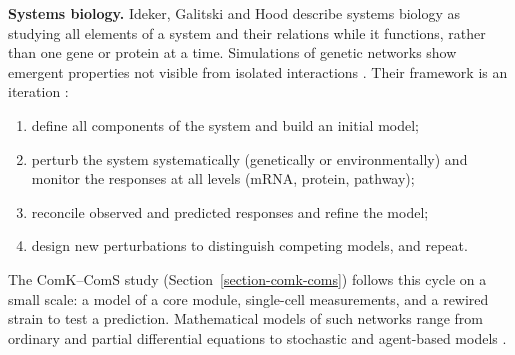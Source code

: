 \textbf{Systems biology.}
Ideker, Galitski and Hood describe systems
biology as studying all elements of a
system and their relations while it
functions, rather than one gene or protein
at a time. Simulations of genetic networks
show emergent properties not visible from
isolated interactions
\cite[p.~351]{ideker2001new}. Their
framework is an iteration
\cite[pp.~354--355]{ideker2001new}:
\begin{enumerate}
\item define all components of the system
and build an initial model;
\item perturb the system systematically
(genetically or environmentally) and
monitor the responses at all levels
(mRNA, protein, pathway);
\item reconcile observed and predicted
responses and refine the model;
\item design new perturbations to
distinguish competing models, and repeat.
\end{enumerate}
The ComK--ComS study
(Section~\ref{section-comk-coms}) follows
this cycle on a small scale: a model of a
core module, single-cell measurements, and
a rewired strain to test a prediction.
Mathematical models of such networks range
from ordinary and partial differential
equations to stochastic and agent-based
models \cite{stokes2007modeling}.





